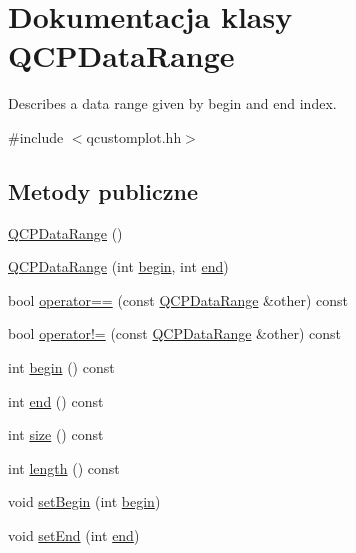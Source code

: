 \hypertarget{class_q_c_p_data_range}{}\section{Dokumentacja klasy Q\+C\+P\+Data\+Range}
\label{class_q_c_p_data_range}


Describes a data range given by begin and end index.  




{\ttfamily \#include $<$qcustomplot.\+hh$>$}

\subsection*{Metody publiczne}
\begin{DoxyCompactItemize}
\item 
\hyperlink{class_q_c_p_data_range_a49e72fd9bace1da9d875136dcc04c986}{Q\+C\+P\+Data\+Range} ()
\item 
\hyperlink{class_q_c_p_data_range_a6c7f4a3684210423270515403060e9cf}{Q\+C\+P\+Data\+Range} (int \hyperlink{class_q_c_p_data_range_a6b14c93d5010e973427b8ecaebf77864}{begin}, int \hyperlink{class_q_c_p_data_range_add50cb7075b68a0dd35fb5c962c81bbf}{end})
\item 
bool \hyperlink{class_q_c_p_data_range_a6947b187a6562b98e22e32a5f9663de2}{operator==} (const \hyperlink{class_q_c_p_data_range}{Q\+C\+P\+Data\+Range} \&other) const 
\item 
bool \hyperlink{class_q_c_p_data_range_a8eaea2a7c791e7ef494b03af547417a4}{operator!=} (const \hyperlink{class_q_c_p_data_range}{Q\+C\+P\+Data\+Range} \&other) const 
\item 
int \hyperlink{class_q_c_p_data_range_a6b14c93d5010e973427b8ecaebf77864}{begin} () const 
\item 
int \hyperlink{class_q_c_p_data_range_add50cb7075b68a0dd35fb5c962c81bbf}{end} () const 
\item 
int \hyperlink{class_q_c_p_data_range_aec29c6f4234c01ed7a56c3bb0e75f340}{size} () const 
\item 
int \hyperlink{class_q_c_p_data_range_a4e65d1bf09fce82dbc67a7b71b2cf088}{length} () const 
\item 
void \hyperlink{class_q_c_p_data_range_a54ff59048e01e46ac4aefafc844626c6}{set\+Begin} (int \hyperlink{class_q_c_p_data_range_a6b14c93d5010e973427b8ecaebf77864}{begin})
\item 
void \hyperlink{class_q_c_p_data_range_a277f1a9eafe70b9184d9c00b641ae5de}{set\+End} (int \hyperlink{class_q_c_p_data_range_add50cb7075b68a0dd35fb5c962c81bbf}{end})

\end{DoxyCompactItemize}

